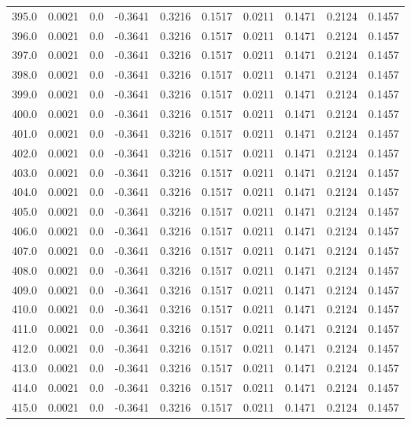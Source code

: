 \begin{longtable}{lrrrrrrrrr}
395.0 & 0.0021 & 0.0 & -0.3641 & 0.3216 & 0.1517 & 0.0211 & 0.1471 & 0.2124 & 0.1457 \\
396.0 & 0.0021 & 0.0 & -0.3641 & 0.3216 & 0.1517 & 0.0211 & 0.1471 & 0.2124 & 0.1457 \\
397.0 & 0.0021 & 0.0 & -0.3641 & 0.3216 & 0.1517 & 0.0211 & 0.1471 & 0.2124 & 0.1457 \\
398.0 & 0.0021 & 0.0 & -0.3641 & 0.3216 & 0.1517 & 0.0211 & 0.1471 & 0.2124 & 0.1457 \\
399.0 & 0.0021 & 0.0 & -0.3641 & 0.3216 & 0.1517 & 0.0211 & 0.1471 & 0.2124 & 0.1457 \\
400.0 & 0.0021 & 0.0 & -0.3641 & 0.3216 & 0.1517 & 0.0211 & 0.1471 & 0.2124 & 0.1457 \\
401.0 & 0.0021 & 0.0 & -0.3641 & 0.3216 & 0.1517 & 0.0211 & 0.1471 & 0.2124 & 0.1457 \\
402.0 & 0.0021 & 0.0 & -0.3641 & 0.3216 & 0.1517 & 0.0211 & 0.1471 & 0.2124 & 0.1457 \\
403.0 & 0.0021 & 0.0 & -0.3641 & 0.3216 & 0.1517 & 0.0211 & 0.1471 & 0.2124 & 0.1457 \\
404.0 & 0.0021 & 0.0 & -0.3641 & 0.3216 & 0.1517 & 0.0211 & 0.1471 & 0.2124 & 0.1457 \\
405.0 & 0.0021 & 0.0 & -0.3641 & 0.3216 & 0.1517 & 0.0211 & 0.1471 & 0.2124 & 0.1457 \\
406.0 & 0.0021 & 0.0 & -0.3641 & 0.3216 & 0.1517 & 0.0211 & 0.1471 & 0.2124 & 0.1457 \\
407.0 & 0.0021 & 0.0 & -0.3641 & 0.3216 & 0.1517 & 0.0211 & 0.1471 & 0.2124 & 0.1457 \\
408.0 & 0.0021 & 0.0 & -0.3641 & 0.3216 & 0.1517 & 0.0211 & 0.1471 & 0.2124 & 0.1457 \\
409.0 & 0.0021 & 0.0 & -0.3641 & 0.3216 & 0.1517 & 0.0211 & 0.1471 & 0.2124 & 0.1457 \\
410.0 & 0.0021 & 0.0 & -0.3641 & 0.3216 & 0.1517 & 0.0211 & 0.1471 & 0.2124 & 0.1457 \\
411.0 & 0.0021 & 0.0 & -0.3641 & 0.3216 & 0.1517 & 0.0211 & 0.1471 & 0.2124 & 0.1457 \\
412.0 & 0.0021 & 0.0 & -0.3641 & 0.3216 & 0.1517 & 0.0211 & 0.1471 & 0.2124 & 0.1457 \\
413.0 & 0.0021 & 0.0 & -0.3641 & 0.3216 & 0.1517 & 0.0211 & 0.1471 & 0.2124 & 0.1457 \\
414.0 & 0.0021 & 0.0 & -0.3641 & 0.3216 & 0.1517 & 0.0211 & 0.1471 & 0.2124 & 0.1457 \\
415.0 & 0.0021 & 0.0 & -0.3641 & 0.3216 & 0.1517 & 0.0211 & 0.1471 & 0.2124 & 0.1457 \\

\end{longtable}
